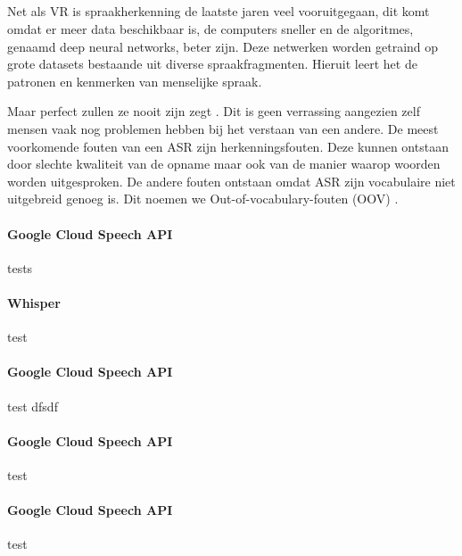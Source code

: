 \subsection{}%

Net als VR is spraakherkenning de laatste jaren veel vooruitgegaan, dit komt omdat er meer data beschikbaar is, de computers sneller en de algoritmes, genaamd deep neural networks, beter zijn. Deze netwerken worden getraind op grote datasets bestaande uit diverse spraakfragmenten. Hieruit leert het de patronen en kenmerken van menselijke spraak.

Maar perfect zullen ze nooit zijn zegt \textcite{Hessen2020}. Dit is geen verrassing aangezien zelf mensen vaak nog problemen hebben bij het verstaan van een andere. De meest voorkomende fouten van een ASR zijn herkenningsfouten. Deze kunnen ontstaan door slechte kwaliteit van de opname maar ook van de manier waarop woorden worden uitgesproken. De andere fouten ontstaan omdat ASR zijn vocabulaire niet uitgebreid genoeg is. Dit noemen we Out-of-vocabulary-fouten (OOV) \autocite{Hessen2020}.

\paragraph{Google Cloud Speech API}%

tests

\paragraph{Whisper}%

test

\paragraph{Google Cloud Speech API}%

test dfsdf

\paragraph{Google Cloud Speech API}%

test

\paragraph{Google Cloud Speech API}%

test

